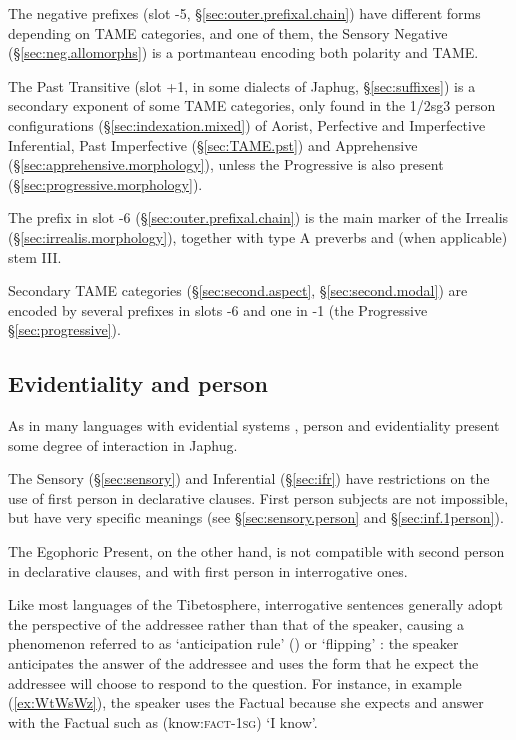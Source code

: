 The negative prefixes (slot -5, §\ref{sec:outer.prefixal.chain}) have different forms depending on TAME categories, and one of them, the Sensory Negative  (§\ref{sec:neg.allomorphs}) is a portmanteau encoding both polarity and TAME.

The Past Transitive  (slot +1,  in some dialects of Japhug, §\ref{sec:suffixes})  is a secondary exponent of some TAME categories, only found in the 1/2sg\fl{}3 person configurations (§\ref{sec:indexation.mixed}) of Aorist, Perfective and Imperfective Inferential, Past Imperfective (§\ref{sec:TAME.pst}) and Apprehensive (§\ref{sec:apprehensive.morphology}), unless the Progressive  is also present (§\ref{sec:progressive.morphology}). 

The prefix  in slot -6 (§\ref{sec:outer.prefixal.chain}) is the main marker of the Irrealis (§\ref{sec:irrealis.morphology}), together with type A preverbs and (when applicable) stem III.

Secondary TAME categories (§\ref{sec:second.aspect}, §\ref{sec:second.modal}) are encoded by several prefixes in slots -6 and one in -1 (the Progressive §\ref{sec:progressive}).

\subsection{Evidentiality and person} \label{sec:anticipation.person}
As in many languages with evidential systems \citep{sun18evidentials}, person and evidentiality present some degree of interaction in Japhug.

The Sensory (§\ref{sec:sensory}) and Inferential (§\ref{sec:ifr}) have restrictions on the use of first person in declarative clauses. First person subjects are not impossible, but have very specific meanings (see §\ref{sec:sensory.person} and §\ref{sec:inf.1person}).

The Egophoric Present, on the other hand, is not compatible with second person in declarative clauses, and with first person in interrogative ones.

Like most languages of the Tibetosphere, interrogative sentences generally adopt the perspective of the addressee rather than that of the speaker, causing a phenomenon referred to as `anticipation rule' (\citealt[244]{tournadre14evidentiality}) or `flipping' \citep{sanroque17interrogativity}:   the speaker anticipates the answer of the addressee and uses the form that he expect the addressee will choose to respond to the question. For instance, in example (\ref{ex:WtWsWz}), the speaker uses the Factual because she expects and answer with the Factual such as  (know:\textsc{fact}-\textsc{1sg}) `I know'.

